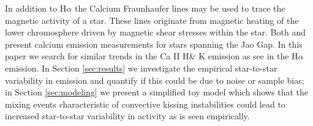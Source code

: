 In addition to H$\alpha$ the Calcium Fraunhaufer lines may be used to trace the
magnetic activity of a star. These lines originate from magnetic heating of the
lower chromosphere driven by magnetic shear stresses within the star.
Both \citet{Perdelwitz2021} and \citet{Boudreaux2022} present calcium emission
measurements for stars spanning the Jao Gap. In this paper we search for
similar trends in the Ca II H\& K emission as \citeauthor{Jao2023} see in the
H$\alpha$ emission. In Section \ref{sec:results} we investigate the empirical
star-to-star variability in emission and quantify if this could be due to noise
or sample bias; in Section \ref{sec:modeling} we present a simplified toy model
which shows that the mixing events characteristic of convective kissing
instabilities could lead to increased star-to-star variability in activity as
is seen empirically.

%

